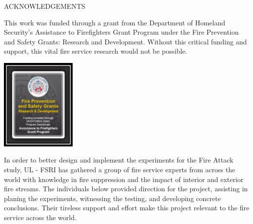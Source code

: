 \documentclass{article}
\begin{document}
\begin{center}
	ACKNOWLEDGEMENTS
\vspace*{\baselineskip}
\begin{adjustwidth}{-0.25in}{-0.25in}
This work was funded through a grant from the Department of Homeland Security's Assistance to Firefighters Grant Program under the Fire Prevention and Safety Grants: Research and Development. Without this critical funding and support, this vital fire service research would not be possible.

\vspace*{\baselineskip}

\begin{center}
	\includegraphics[width=0.28\textwidth]{Figures/General/DHS}
\end{center}

\clearpage

In order to better design and implement the experiments for the Fire Attack study, UL - FSRI has gathered a group of fire service experts from across the world with knowledge in fire suppression and the impact of interior and exterior fire streams. The individuals below provided direction for the project, assisting in planing the experiments, witnessing the testing, and developing concrete conclusions. Their tireless support and effort make this project relevant to the fire service across the world. 

\vspace*{\baselineskip}

\renewcommand{\arraystretch}{1.5}


\end{adjustwidth}
\end{center}
\end{document}
